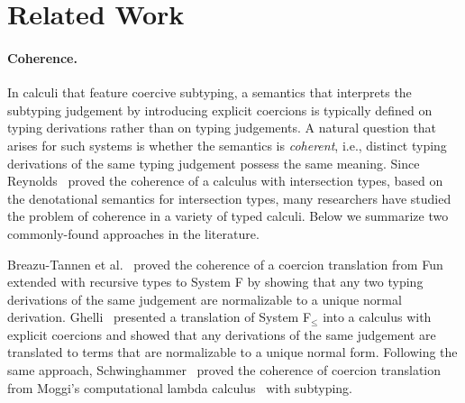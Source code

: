 
\section{Related Work}
\label{sec:related}

\paragraph{Coherence.}
In calculi that feature coercive subtyping, a semantics that interprets the
subtyping judgement by introducing explicit coercions is typically defined on
typing derivations rather than on typing judgements. A natural
question that arises
for such systems is whether the semantics is \textit{coherent}, i.e.,
distinct typing derivations of the same typing judgement possess the same
meaning. Since Reynolds~\cite{Reynolds_1991} proved the coherence of a calculus with
intersection types, based on the denotational semantics for intersection types,
many researchers have studied the problem of coherence in a variety of typed
calculi. Below we summarize two commonly-found approaches in the literature.

Breazu-Tannen et al.~\cite{Breazu_Tannen_1991} proved
the coherence of a coercion translation from Fun~\cite{cardelli1985understanding}
extended with recursive types to System F by showing that any two
typing derivations of the same judgement are normalizable to a unique
normal derivation. %
Ghelli~\cite{Curien_1992} presented a translation of System F$_\leq$ into a calculus
with explicit coercions and showed that any derivations of the same judgement are
translated to terms that are normalizable to a unique normal form. Following the
same approach, Schwinghammer~\cite{SCHWINGHAMMER_2008} proved the coherence of coercion
translation from Moggi's computational lambda calculus~\cite{Moggi_1991} with subtyping.



